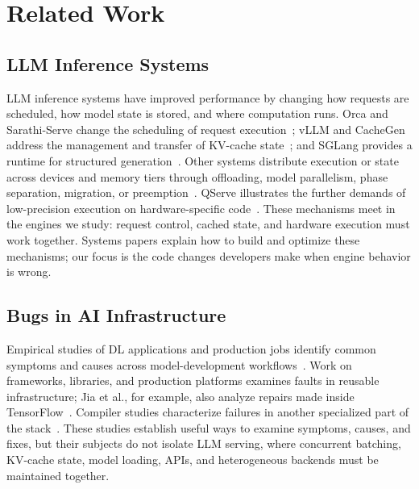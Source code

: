 \section{Related Work}
\label{sec:related_work}

\subsection{LLM Inference Systems}

LLM inference systems have improved performance by changing how requests are scheduled, how model state is stored, and where computation runs. Orca and Sarathi-Serve change the scheduling of request execution~\cite{yu2022orca,agrawal2024sarathi}; vLLM and CacheGen address the management and transfer of KV-cache state~\cite{kwon2023pagedattention,liu2024cachegen}; and SGLang provides a runtime for structured generation~\cite{zheng2024sglang}. Other systems distribute execution or state across devices and memory tiers through offloading, model parallelism, phase separation, migration, or preemption~\cite{sheng2023flexgen,aminabadi2022deepspeed,zhong2024distserve,patel2024splitwise,sun2024llumnix,miao2024spotserve}. QServe illustrates the further demands of low-precision execution on hardware-specific code~\cite{lin2025qserve}. These mechanisms meet in the engines we study: request control, cached state, and hardware execution must work together. Systems papers explain how to build and optimize these mechanisms; our focus is the code changes developers make when engine behavior is wrong.

\subsection{Bugs in AI Infrastructure}

Empirical studies of DL applications and production jobs identify common symptoms and causes across model-development workflows~\cite{zhang2018tensorflowbugs,zhang2020dljobfailures,islam2019bugs,humbatova2020taxonomy}. Work on frameworks, libraries, and production platforms examines faults in reusable infrastructure; Jia et al., for example, also analyze repairs made inside TensorFlow~\cite{yang2022frameworkbugs,chen2023frameworkbugs,tambon2024silentbugs,gao2023platformquality,jia2021tensorflowbugs}. Compiler studies characterize failures in another specialized part of the stack~\cite{shen2021compilerbugs,du2021compilerbugs,shen2025compilerevolution}. These studies establish useful ways to examine symptoms, causes, and fixes, but their subjects do not isolate LLM serving, where concurrent batching, KV-cache state, model loading, APIs, and heterogeneous backends must be maintained together.

